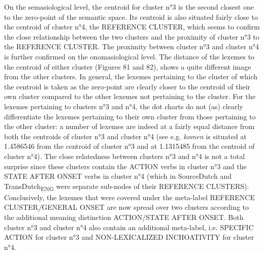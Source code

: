 On the semasiological level, the centroid for cluster n°3 is the second closest one to the zero-point of the semantic space. Its centroid is also situated fairly close to the centroid of cluster n°4, the REFERENCE CLUSTER, which seems to confirm the close relationship between the two clusters and the proximity of cluster n°3 to the REFERENCE CLUSTER. The proximity between cluster n°3 and cluster n°4 is further confirmed on the onomasiological level. The distance of the lexemes to the centroid of either cluster (Figures 81 and 82), shows a quite different image from the other clusters. In general, the lexemes pertaining to the cluster of which the centroid is taken as the zero-point are clearly closer to the centroid of their own cluster compared to the other lexemes not pertaining to the cluster. For the lexemes pertaining to clusters n°3 and n°4, the dot charts do not (as) clearly differentiate the lexemes pertaining to their own cluster from those pertaining to the other cluster: a number of lexemes are indeed at a fairly equal distance from both the centroids of cluster n°3 and cluster n°4 (see e.g. \textit{komen} is situated at 1.4586546 from the centroid of cluster n°3 and at 1.1315485 from the centroid of cluster n°4). The close relatedness between clusters n°3 and n°4 is not a total surprise since these clusters contain the ACTION verbs in cluster n°3 and the STATE AFTER ONSET verbs in cluster n°4 (which in SourceDutch and TransDutch\textsubscript{ENG} were separate sub-nodes of their REFERENCE CLUSTERS). Conclusively, the lexemes that were covered under the meta-label REFERENCE CLUSTER\textit{/}GENERAL ONSET are now spread over two clusters according to the additional meaning distinction ACTION\slash STATE AFTER ONSET. Both cluster n°3 and cluster n°4 also contain an additional meta-label, i.e. {SPECIFIC} ACTION for cluster n°3 and {NON-LEXICALIZED INCHOATIVITY} for cluster n°4.


